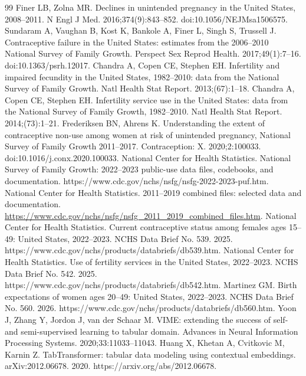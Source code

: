 \documentclass[referee,pdflatex,sn-basic,Numbered]{sn-jnl}
\begin{document}
\begin{thebibliography}{99}
 Finer LB, Zolna MR. Declines in unintended pregnancy in the United States, 2008--2011. N Engl J Med. 2016;374(9):843--852. doi:10.1056/NEJMsa1506575.
 Sundaram A, Vaughan B, Kost K, Bankole A, Finer L, Singh S, Trussell J. Contraceptive failure in the United States: estimates from the 2006--2010 National Survey of Family Growth. Perspect Sex Reprod Health. 2017;49(1):7--16. doi:10.1363/psrh.12017.
 Chandra A, Copen CE, Stephen EH. Infertility and impaired fecundity in the United States, 1982--2010: data from the National Survey of Family Growth. Natl Health Stat Report. 2013;(67):1--18.
 Chandra A, Copen CE, Stephen EH. Infertility service use in the United States: data from the National Survey of Family Growth, 1982--2010. Natl Health Stat Report. 2014;(73):1--21.
 Frederiksen BN, Ahrens K. Understanding the extent of contraceptive non-use among women at risk of unintended pregnancy, National Survey of Family Growth 2011--2017. Contraception: X. 2020;2:100033. doi:10.1016/j.conx.2020.100033.
 National Center for Health Statistics. National Survey of Family Growth: 2022--2023 public-use data files, codebooks, and documentation. https://www.cdc.gov/nchs/nsfg/nsfg-2022-2023-puf.htm.
 National Center for Health Statistics. 2011--2019 combined files: selected data and documentation. \url{https://www.cdc.gov/nchs/nsfg/nsfg_2011_2019_combined_files.htm}.
 National Center for Health Statistics. Current contraceptive status among females ages 15--49: United States, 2022--2023. NCHS Data Brief No. 539. 2025. https://www.cdc.gov/nchs/products/databriefs/db539.htm.
 National Center for Health Statistics. Use of fertility services in the United States, 2022--2023. NCHS Data Brief No. 542. 2025. https://www.cdc.gov/nchs/products/databriefs/db542.htm.
 Martinez GM. Birth expectations of women ages 20--49: United States, 2022--2023. NCHS Data Brief No. 560. 2026. https://www.cdc.gov/nchs/products/databriefs/db560.htm.
 Yoon J, Zhang Y, Jordon J, van der Schaar M. VIME: extending the success of self- and semi-supervised learning to tabular domain. Advances in Neural Information Processing Systems. 2020;33:11033--11043.
 Huang X, Khetan A, Cvitkovic M, Karnin Z. TabTransformer: tabular data modeling using contextual embeddings. arXiv:2012.06678. 2020. https://arxiv.org/abs/2012.06678.

\end{thebibliography}
\end{document}
